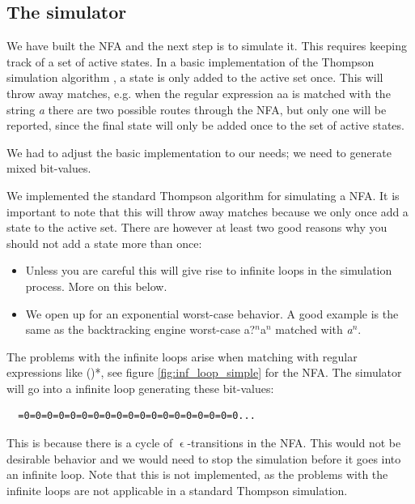 \subsection{The simulator}

We have built the NFA and the next step is to simulate it. This
requires keeping track of a set of active states. In a basic
implementation of the Thompson simulation algorithm
\cite{Thompson1968}, a state is only added to the active set
once. This will throw away matches, e.g. when the regular expression
\textsf{a\textbar a} is matched with the string \textsl{a} there are
two possible routes through the NFA, but only one will be reported,
since the final state will only be added once to the set of active
states.

We had to adjust the basic implementation to our needs; we need to
generate mixed bit-values. 

We implemented the standard Thompson algorithm for simulating a
NFA. It is important to note that this will throw away matches because
we only once add a state to the active set. There are however at least
two good reasons why you should not add a state more than once:
\begin{itemize}
\item Unless you are careful this will give rise to infinite loops in
  the simulation process. More on this below.
\item We open up for an exponential worst-case behavior. A good
  example is the same as the backtracking engine worst-case
  \textsf{a?$^n$a$^n$} matched with \textsl{a$^n$}. 
\end{itemize}

The problems with the infinite loops arise when matching with regular
expressions like \textsf{()*}, see figure \vref{fig:inf_loop_simple}
for the NFA. The simulator will go into a infinite loop generating
these bit-values:
\begin{verbatim}
  =0=0=0=0=0=0=0=0=0=0=0=0=0=0=0=0=0=0=0...
\end{verbatim}
This is because there is a cycle of $\upvarepsilon$-transitions in the
NFA. This would not be desirable behavior and we would need to stop
the simulation before it goes into an infinite loop. Note that this is
not implemented, as the problems with the infinite loops are not
applicable in a standard Thompson simulation.

